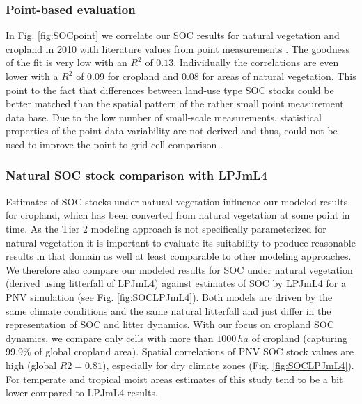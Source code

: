 \documentclass[gc, manuscript]{copernicus}
\begin{document}
\hypertarget{point-based-evaluation}{%
\subsubsection{Point-based evaluation}\label{point-based-evaluation}}

In Fig. \ref{fig:SOCpoint} we correlate our SOC results for natural vegetation and cropland in 2010 with literature values from point measurements \citep[for data base see appendix of][]{sanderman_soil_2017}. The goodness of the fit is very low with an \(R^2\) of \(0.13\). Individually the correlations are even lower with a \(R^2\) of \(0.09\) for cropland and \(0.08\) for areas of natural vegetation. This point to the fact that differences between land-use type SOC stocks could be better matched than the spatial pattern of the rather small point measurement data base.
Due to the low number of small-scale measurements, statistical properties of the point data variability are not derived and thus, could not be used to improve the point-to-grid-cell comparison \citep[see][]{rammig_generic_2018}.

\hypertarget{natural-soc-stock-comparison-with-lpjml4}{%
\subsubsection{Natural SOC stock comparison with LPJmL4}\label{natural-soc-stock-comparison-with-lpjml4}}

Estimates of SOC stocks under natural vegetation influence our modeled results for cropland, which has been converted from natural vegetation at some point in time. As the Tier 2 modeling approach \citep{ogle_cropland_in_ipcc_2019} is not specifically parameterized for natural vegetation it is important to evaluate its suitability to produce reasonable results in that domain as well at least comparable to other modeling approaches.
We therefore also compare our modeled results for SOC under natural vegetation (derived using litterfall of LPJmL4) against estimates of SOC by LPJmL4 for a PNV simulation (see Fig. \ref{fig:SOCLPJmL4}). Both models are driven by the same climate conditions and the same natural litterfall and just differ in the representation of SOC and litter dynamics. With our focus on cropland SOC dynamics, we compare only cells with more than \(1000\,\unit{ha}\) of cropland (capturing 99.9\% of global cropland area).
Spatial correlations of PNV SOC stock values are high (global \(R2=0.81\)), especially for dry climate zones (Fig. \ref{fig:SOCLPJmL4}). For temperate and tropical moist areas estimates of this study tend to be a bit lower compared to LPJmL4 results.
\end{document}
